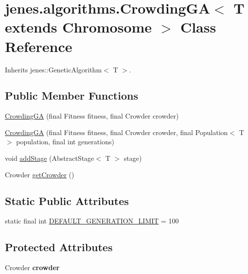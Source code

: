 \hypertarget{classjenes_1_1algorithms_1_1_crowding_g_a_3_01_t_01extends_01_chromosome_01_4}{
\section{jenes.algorithms.CrowdingGA$<$ T extends Chromosome $>$ Class Reference}
\label{classjenes_1_1algorithms_1_1_crowding_g_a_3_01_t_01extends_01_chromosome_01_4}
}
Inherits jenes::GeneticAlgorithm$<$ T $>$.

\subsection*{Public Member Functions}
\begin{CompactItemize}
\item 
\hyperlink{classjenes_1_1algorithms_1_1_crowding_g_a_3_01_t_01extends_01_chromosome_01_4_5f9de70a8e431de7e0f9bbb6bb42ec1e}{CrowdingGA} (final Fitness fitness, final Crowder crowder)
\item 
\hyperlink{classjenes_1_1algorithms_1_1_crowding_g_a_3_01_t_01extends_01_chromosome_01_4_d3e5e26f962e7839e076b61efcd5704f}{CrowdingGA} (final Fitness fitness, final Crowder crowder, final Population$<$ T $>$ population, final int generations)
\item 
void \hyperlink{classjenes_1_1algorithms_1_1_crowding_g_a_3_01_t_01extends_01_chromosome_01_4_d241412becfe0073cbeb06418a1e49f3}{addStage} (AbstractStage$<$ T $>$ stage)
\item 
Crowder \hyperlink{classjenes_1_1algorithms_1_1_crowding_g_a_3_01_t_01extends_01_chromosome_01_4_6cc270cedf906a0743cb743b30c2ba02}{getCrowder} ()
\end{CompactItemize}
\subsection*{Static Public Attributes}
\begin{CompactItemize}
\item 
static final int \hyperlink{classjenes_1_1algorithms_1_1_crowding_g_a_3_01_t_01extends_01_chromosome_01_4_fb96c2e73129293b45044998e3614c06}{DEFAULT\_\-GENERATION\_\-LIMIT} = 100
\end{CompactItemize}
\subsection*{Protected Attributes}
\begin{CompactItemize}
\item 
\hypertarget{classjenes_1_1algorithms_1_1_crowding_g_a_3_01_t_01extends_01_chromosome_01_4_a747112afbb20cb4faec643ccc73e396}{
Crowder \textbf{crowder}}
\label{classjenes_1_1algorithms_1_1_crowding_g_a_3_01_t_01extends_01_chromosome_01_4_a747112afbb20cb4faec643ccc73e396}

\end{CompactItemize}



